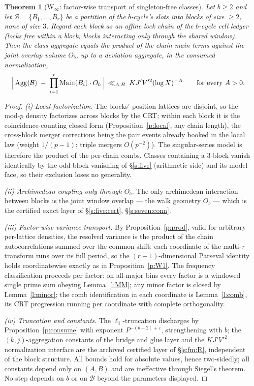 \documentclass[11pt]{article}
\numberwithin{equation}{section}
\newtheorem{theorem}{Theorem}[section]
\theoremstyle{definition}
\theoremstyle{remark}
\begin{document}
\begin{theorem}[W$_\infty$: factor-wise transport of
singleton-free classes]\label{t:winfty}
Let $b\ge2$ and let $\mathcal B=\{B_1,\dots,B_r\}$ be a
partition of the $b$-cycle's slots into blocks of size
$\ge2$, none of size $3$. Regard each block as an affine lock
chain of the $b$-cycle cell ledger (locks free within a block;
blocks interacting only through the shared window). Then the
class aggregate equals the product of the chain main terms
against the joint overlap volume $O_b$, up to a deviation
aggregate, in the consumed normalization,
\[
\Bigl|\,\mathrm{Agg}(\mathcal B)\;-\;\prod_{i=1}^{r}
\mathrm{Main}(B_i)\cdot O_b\,\Bigr|
\;\ll_{A,B}\;KJ'V'^2(\log X)^{-A}
\qquad\text{for every }A>0 .
\]
\end{theorem}

\begin{proof}
\emph{(i) Local factorization.} The blocks' position lattices
are disjoint, so the mod-$p$ density factorizes across blocks
by the CRT; within each block it is the coincidence-counting
closed form (Proposition~\ref{p:local}, any chain length), the
cross-block merger corrections being the pair events already
booked in the local law (weight $1/(p-1)$; triple mergers
$O(p^{-2})$). The singular-series model is therefore the
product of the per-chain combs. Classes containing a $3$-block
vanish identically by the odd-block vanishing of \S\ref{s:five}
(arithmetic side) and its model face, so their exclusion loses
no generality.

\emph{(ii) Archimedean coupling only through $O_b$.} The only
archimedean interaction between blocks is the joint window
overlap --- the walk geometry $O_b$ --- which is the certified
exact layer of \S\ref{s:five:cert}, \S\ref{s:seven:conn}.

\emph{(iii) Factor-wise variance transport.} By
Proposition~\ref{p:prod}, valid for arbitrary per-lattice
densities, the resolved variance is the product of the chain
autocorrelations summed over the common shift; each coordinate
of the multi-$\tau$ transform runs over its full period, so
the $(r{-}1)$-dimensional Parseval identity holds
coordinatewise exactly as in Proposition~\ref{p:W1}. The
frequency classification proceeds per factor: on all-major
bins every factor is a windowed single prime sum obeying
Lemma~\ref{l:MM}; any minor factor is closed by
Lemma~\ref{l:minor}; the comb identification in each
coordinate is Lemma~\ref{l:comb}, its CRT progression running
per coordinate with complete orthogonality.

\emph{(iv) Truncation and constants.} The $\ell_1$-truncation
discharges by Proposition~\ref{p:consume} with exponent
$P^{-(b-2)+\varepsilon}$, strengthening with $b$; the
$(k,j)$-aggregation constants of the bridge and glue layer and
the $KJ'V'^2$ normalization interface are the archived
certified layer of \S\ref{s:fm:R}, independent of the block
structure. All bounds hold for absolute values, hence
two-sidedly; all constants depend only on $(A,B)$ and are
ineffective through Siegel's theorem. No step depends on $b$
or on $\mathcal B$ beyond the parameters displayed.
\end{proof}
\end{document}
